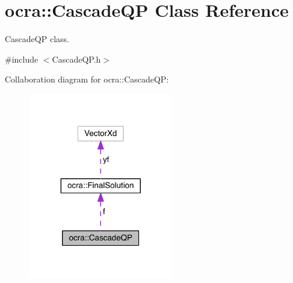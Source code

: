 \hypertarget{classocra_1_1CascadeQP}{}\section{ocra\+:\+:Cascade\+QP Class Reference}
\label{classocra_1_1CascadeQP}


Cascade\+QP class.  




{\ttfamily \#include $<$Cascade\+Q\+P.\+h$>$}



Collaboration diagram for ocra\+:\+:Cascade\+QP\+:\nopagebreak
\begin{figure}[H]
\begin{center}
\leavevmode
\includegraphics[width=179pt]{d6/d63/classocra_1_1CascadeQP__coll__graph}
\end{center}
\end{figure}
